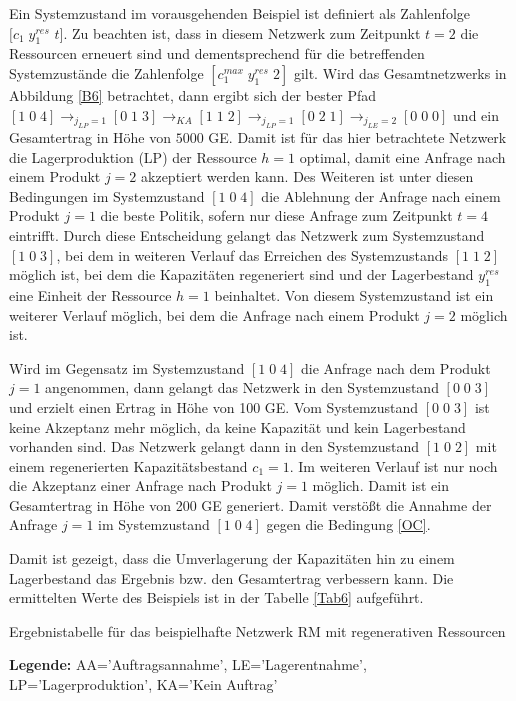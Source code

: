 Ein Systemzustand im vorausgehenden Beispiel ist definiert als Zahlenfolge $[c_1\;y^{res}_1$ $t]$. Zu beachten ist, dass in diesem Netzwerk zum Zeitpunkt $t=2$ die Ressourcen erneuert sind und dementsprechend für die betreffenden Systemzustände die Zahlenfolge $[c_1^{max}\;y^{res}_1\;2]$ gilt. Wird das Gesamtnetzwerks in Abbildung \ref{B6} betrachtet, dann ergibt sich der bester Pfad $[1\;0\;4] \rightarrow_{j_{LP}=1} [0\;1\;3] \rightarrow_{KA} [1\;1\;2] \rightarrow_{j_{LP}=1} [0\;2\;1] \rightarrow_{j_{LE}=2} [0\;0\;0]$ und ein Gesamtertrag in Höhe von $5000$ GE. Damit ist für das hier betrachtete Netzwerk die Lagerproduktion (LP) der Ressource $h=1$ optimal, damit eine Anfrage nach einem Produkt $j=2$ akzeptiert werden kann. Des Weiteren ist unter diesen Bedingungen im Systemzustand $[1\;0\;4]$ die Ablehnung der Anfrage nach einem Produkt $j=1$ die beste Politik, sofern nur diese Anfrage zum Zeitpunkt $t=4$ eintrifft. Durch diese Entscheidung gelangt das Netzwerk zum Systemzustand $[1\;0\;3]$, bei dem in weiteren Verlauf das Erreichen des Systemzustands $[1\;1\;2]$ möglich ist, bei dem die Kapazitäten regeneriert sind und der Lagerbestand $y_1^{res}$ eine Einheit der Ressource $h=1$ beinhaltet. Von diesem Systemzustand ist ein weiterer Verlauf möglich, bei dem die Anfrage nach einem Produkt $j=2$ möglich ist.

Wird im Gegensatz im Systemzustand $[1\;0\;4]$ die Anfrage nach dem Produkt $j=1$ angenommen, dann gelangt das Netzwerk in den Systemzustand $[0\;0\;3]$ und erzielt einen Ertrag in Höhe von 100 GE. Vom Systemzustand $[0\;0\;3]$ ist keine Akzeptanz mehr möglich, da keine Kapazität und kein Lagerbestand vorhanden sind. Das Netzwerk gelangt dann in den Systemzustand $[1\;0\;2]$ mit einem regenerierten Kapazitätsbestand $c_1=1$. Im weiteren Verlauf ist nur noch die Akzeptanz einer Anfrage nach Produkt $j=1$ möglich. Damit ist ein Gesamtertrag in Höhe von 200 GE generiert. Damit verstößt die Annahme der Anfrage $j=1$ im Systemzustand $[1\;0\;4]$ gegen die Bedingung \eqref{OC}.

Damit ist gezeigt, dass die Umverlagerung der Kapazitäten hin zu einem Lagerbestand das Ergebnis bzw. den Gesamtertrag verbessern kann. Die ermittelten Werte des Beispiels ist in der Tabelle \ref{Tab6} aufgeführt.

\begin{table}
\begin{footnotesize}
    \caption{Ergebnistabelle für das beispielhafte Netzwerk RM mit regenerativen Ressourcen} \label{Tab6}
    \vspace*{3mm}
    \begin{center}
      {\footnotesize \textbf{Legende:} AA='Auftragsannahme', LE='Lagerentnahme', LP='Lagerproduktion', KA='Kein Auftrag'} 
      \end{center}
\end{footnotesize}
\end{table}

